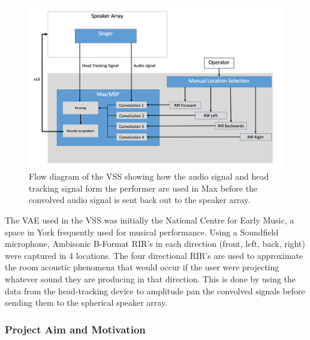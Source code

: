 \documentclass[../../main.tex]{subfiles}
\begin{document}
	
		\begin{figure}[H]
			\centerline{\includegraphics[scale = 0.45]{Sections/Background/images/vssDiagram.png}}
			\caption{Flow diagram of the VSS showing how the audio signal and head tracking signal form the performer are used in Max before the convolved audio signal is sent back out to the speaker array.}
			\label{vssDiagram}
		\end{figure}

		The \ac{VAE} used in the \ac{VSS} was initially the National Centre for Early Music, a space in York frequently used for musical performance. Using a Soundfield microphone, Ambisonic B-Format \ac{RIR}'s in each direction (front, left, back, right) were captured in 4 locations. The four directional \ac{RIR}'s are used to approximate the room acoustic phenomena that would occur if the user were projecting whatever sound they are producing in that direction. This is done by using the data from the head-tracking device to amplitude pan the convolved signals before sending them to the spherical speaker array.


	\subsubsection{Project Aim and Motivation}
		
\end{document}
